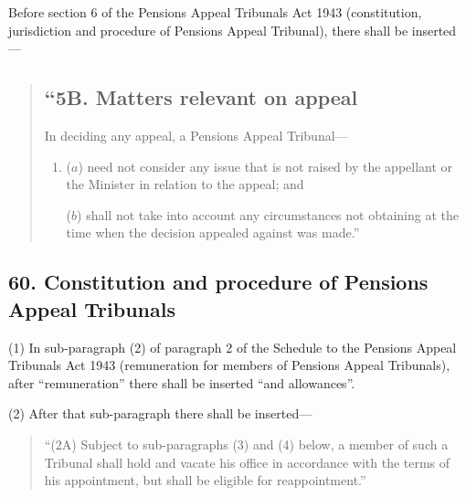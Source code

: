 \documentclass[12pt,a4paper]{article}
\begin{document}
Before section 6 of the Pensions Appeal Tribunals Act 1943 (constitution, jurisdiction and procedure of Pensions Appeal Tribunal), there shall be inserted—
\begin{quotation}
\subsection*{“5B. Matters relevant on appeal}

In deciding any appeal, a Pensions Appeal Tribunal—
\begin{enumerate}\item[]
($a$) need not consider any issue that is not raised by the appellant or the Minister in relation to the appeal; and

($b$) shall not take into account any circumstances not obtaining at the time when the decision appealed against was made.”
\end{enumerate}
\end{quotation}

\subsection{60. Constitution and procedure of Pensions Appeal Tribunals}

(1) In sub-paragraph (2)  of paragraph 2 of the Schedule to the Pensions Appeal Tribunals Act 1943 (remuneration for members of Pensions Appeal Tribunals), after “remuneration” there shall be inserted “and allowances”.

(2) After that sub-paragraph there shall be inserted—
\begin{quotation}
“(2A) Subject to sub-paragraphs (3)  and (4)  below, a member of such a Tribunal shall hold and vacate his office in accordance with the terms of his appointment, but shall be eligible for reappointment.”
\end{quotation}
\end{document}
